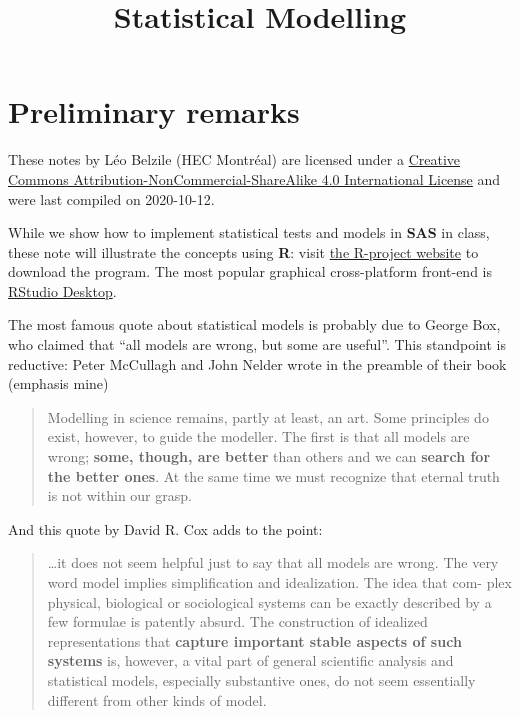 \documentclass[
  11pt,
  letterpaper,
]{book}
\title{Statistical Modelling}
\author{}
\date{\vspace{-2.5em}}
\let\oldhref\href
\renewcommand{\href}[2]{#2\footnote{\url{#1}}}
\theoremstyle{definition}
\theoremstyle{definition}
\theoremstyle{definition}
\theoremstyle{remark}
\begin{document}
\maketitle

\let\href\oldhref

{
\setcounter{tocdepth}{1}
\tableofcontents
}
\hypertarget{preliminary-remarks}{%
\chapter*{Preliminary remarks}\label{preliminary-remarks}}

These notes by Léo Belzile (HEC Montréal) are licensed under a \href{http://creativecommons.org/licenses/by-nc-sa/4.0/}{Creative Commons Attribution-NonCommercial-ShareAlike 4.0 International License} and were last compiled on 2020-10-12.

While we show how to implement statistical tests and models in \textbf{SAS} in class, these note will illustrate the concepts using \textbf{R}: visit \href{https://cran.r-project.org/}{the R-project website} to download the program. The most popular graphical cross-platform front-end is \href{https://www.rstudio.com/products/rstudio/download/}{RStudio Desktop}.

The most famous quote about statistical models is probably due to George Box, who claimed that ``all models are wrong, but some are useful''. This standpoint is reductive: Peter McCullagh and John Nelder wrote in the preamble of their book (emphasis mine)

\begin{quote}
Modelling in science remains, partly at least, an art. Some principles do exist, however, to guide the modeller. The first is that all models are wrong; \textbf{some, though, are better} than others and we can \textbf{search for the better ones}. At the same time we must recognize that eternal truth is not within our grasp.
\end{quote}

And this quote by David R. Cox adds to the point:

\begin{quote}
\ldots it does not seem helpful just to say that all models are wrong. The very word model implies simplification and idealization. The idea that com-
plex physical, biological or sociological systems can be exactly described
by a few formulae is patently absurd. The construction of idealized representations that \textbf{capture important stable aspects of such systems}
is, however, a vital part of general scientific analysis and statistical models, especially substantive ones, do not seem essentially different from
other kinds of model.
\end{quote}
\end{document}
